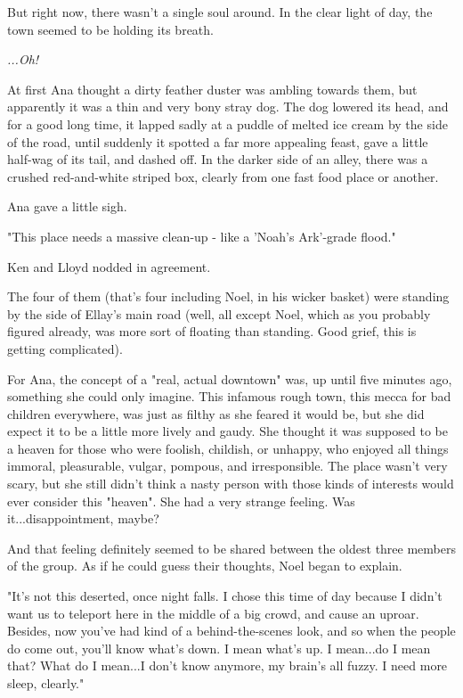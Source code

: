 \documentclass[
]{article}
\begin{document}
But right now, there wasn't a single soul around. In the clear light of
day, the town seemed to be holding its breath.

\emph{...Oh!}

At first Ana thought a dirty feather duster was ambling towards them,
but apparently it was a thin and very bony stray dog. The dog lowered
its head, and for a good long time, it lapped sadly at a puddle of
melted ice cream by the side of the road, until suddenly it spotted a
far more appealing feast, gave a little half-wag of its tail, and dashed
off. In the darker side of an alley, there was a crushed red-and-white
striped box, clearly from one fast food place or another.

Ana gave a little sigh.

"This place needs a massive clean-up - like a 'Noah's Ark'-grade flood."

Ken and Lloyd nodded in agreement.

The four of them (that's four including Noel, in his wicker basket) were
standing by the side of Ellay's main road (well, all except Noel, which
as you probably figured already, was more sort of floating than
standing. Good grief, this is getting complicated).

For Ana, the concept of a "real, actual downtown" was, up until five
minutes ago, something she could only imagine. This infamous rough town,
this mecca for bad children everywhere, was just as filthy as she feared
it would be, but she did expect it to be a little more lively and gaudy.
She thought it was supposed to be a heaven for those who were foolish,
childish, or unhappy, who enjoyed all things immoral, pleasurable,
vulgar, pompous, and irresponsible. The place wasn't very scary, but she
still didn't think a nasty person with those kinds of interests would
ever consider this "heaven". She had a very strange feeling. Was
it...disappointment, maybe?

And that feeling definitely seemed to be shared between the oldest three
members of the group. As if he could guess their thoughts, Noel began to
explain.

"It's not this deserted, once night falls. I chose this time of day
because I didn't want us to teleport here in the middle of a big crowd,
and cause an uproar. Besides, now you've had kind of a behind-the-scenes
look, and so when the people do come out, you'll know what's down. I
mean what's up. I mean...do I mean that? What do I mean...I don't know
anymore, my brain's all fuzzy. I need more sleep, clearly."
\end{document}
